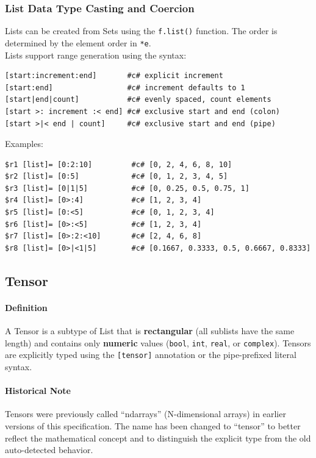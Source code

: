 \subsubsection{List Data Type Casting and Coercion}
Lists can be created from Sets using the \texttt{f.list()} function. The order is determined by the element order in \texttt{*e}.\\
Lists support range generation using the syntax:
\begin{verbatim}
[start:increment:end]       #c# explicit increment
[start:end]                 #c# increment defaults to 1
[start|end|count]           #c# evenly spaced, count elements
[start >: increment :< end] #c# exclusive start and end (colon)
[start >|< end | count]     #c# exclusive start and end (pipe)
\end{verbatim}
Examples:
\begin{verbatim}
$r1 [list]= [0:2:10]         #c# [0, 2, 4, 6, 8, 10]
$r2 [list]= [0:5]            #c# [0, 1, 2, 3, 4, 5]
$r3 [list]= [0|1|5]          #c# [0, 0.25, 0.5, 0.75, 1]
$r4 [list]= [0>:4]           #c# [1, 2, 3, 4]
$r5 [list]= [0:<5]           #c# [0, 1, 2, 3, 4]
$r6 [list]= [0>:<5]          #c# [1, 2, 3, 4]
$r7 [list]= [0>:2:<10]       #c# [2, 4, 6, 8]
$r8 [list]= [0>|<1|5]        #c# [0.1667, 0.3333, 0.5, 0.6667, 0.8333]
\end{verbatim}
\subsection{Tensor}
\paragraph{Definition}
A Tensor is a subtype of List that is \textbf{rectangular} (all sublists have the same length) and contains only \textbf{numeric} values (\texttt{bool}, \texttt{int}, \texttt{real}, or \texttt{complex}). Tensors are explicitly typed using the \texttt{[tensor]} annotation or the pipe-prefixed literal syntax.

\paragraph{Historical Note}
Tensors were previously called ``ndarrays'' (N-dimensional arrays) in earlier versions of this specification. The name has been changed to ``tensor'' to better reflect the mathematical concept and to distinguish the explicit type from the old auto-detected behavior.

